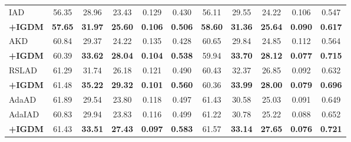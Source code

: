 \documentclass{article} %
\begin{document}
\begin{table}[h]
\begin{tabular}{lcccccccccc}
 IAD & 56.35 & 28.96 & 23.43 & 0.129 & 0.430
& 56.11 & 29.55 & 24.22 & 0.106 & 0.547 
\\
 \textbf{+IGDM} & \textbf{57.65} & \textbf{31.97} & \textbf{25.60} & \textbf{0.106} & \textbf{0.506} 
& \textbf{58.60} & \textbf{31.36} & \textbf{25.64} & \textbf{0.090} & \textbf{0.617} 
\\
 \midrule
 AKD & 60.84& 29.37& 24.22& 0.135& 0.428& 60.65& 29.84& 24.85& 0.112& 0.564\\
 \textbf{+IGDM} & 60.39& \textbf{33.62}& \textbf{28.04}& \textbf{0.104}& \textbf{0.538}& 59.94& \textbf{33.70}& \textbf{28.12}& \textbf{0.077}& \textbf{0.715}\\
 \midrule
 RSLAD & 61.29 & 31.74 & 26.18 & 0.121 &0.490  
& 60.43 & 32.37 & 26.85 & 0.092 & 0.632 
\\
 \textbf{+IGDM} & 61.48 & \textbf{35.22} & \textbf{29.32} & \textbf{0.101} & \textbf{0.560}  
& 
60.36 & \textbf{33.99} & \textbf{28.00} & \textbf{0.079} & \textbf{0.696} 
\\
 \midrule
 AdaAD &61.89 & 29.54 & 23.80 & 0.118 & 0.497  
& 61.43& 30.58 & 25.03 & 0.091 & 0.649 
\\
 AdaIAD & 60.83& 29.94& 23.83& 0.116& 0.499& 
61.22& 30.78& 25.22& 0.088& 0.652\\
 \textbf{+IGDM} & 61.43 & \textbf{33.51} & \textbf{27.43} & \textbf{0.097} & \textbf{0.583} & 61.57& \textbf{33.14} & \textbf{27.65} & \textbf{0.076} & \textbf{0.721} \\
\bottomrule
 \end{tabular}
 \label{tab:MNV2_cifar100}
\end{table}
\end{document}

